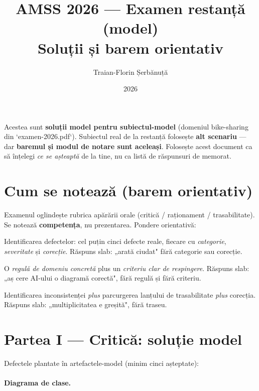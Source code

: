 \documentclass[12pt,a4paper]{article}
\title{AMSS 2026 — Examen restanță (model) \\ \large Soluții și barem orientativ}
\author{Traian-Florin Șerbănuță}
\date{2026}
\begin{document}
\maketitle

\begin{framed}
\noindent Acestea sunt \textbf{soluții model pentru subiectul-model}
(domeniul bike-sharing din `examen-2026.pdf`). Subiectul real de la
restanță folosește \textbf{alt scenariu} — dar \textbf{baremul și modul
de notare sunt aceleași}. Folosește acest document ca să înțelegi
\emph{ce se așteaptă} de la tine, nu ca listă de răspunsuri de memorat.
\end{framed}

\bigskip

\section*{Cum se notează (barem orientativ)}

Examenul oglindește rubrica apărării orale (critică / raționament / trasabilitate). Se notează
\textbf{competența}, nu prezentarea. Pondere orientativă:

\begin{description}[leftmargin=4.5em,style=nextline]
  \item[Partea I — \char`~50\%] Identificarea defectelor: cel puțin
        cinci defecte reale, fiecare cu \emph{categorie}, \emph{severitate}
        și \emph{corecție}. Răspuns slab: „arată ciudat" fără categorie
        sau corecție.
  \item[Partea II — \char`~25\%] O \emph{regulă de domeniu concretă}
        plus un \emph{criteriu clar de respingere}. Răspuns slab: „aș cere
        AI-ului o diagramă corectă", fără regulă și fără criteriu.
  \item[Partea III — \char`~25\%] Identificarea inconsistenței
        \emph{plus} parcurgerea lanțului de trasabilitate \emph{plus}
        corecția. Răspuns slab: „multiplicitatea e greșită", fără traseu.
\end{description}

\section*{Partea I — Critică: soluție model}

Defectele plantate în artefactele-model (minim cinci așteptate):

\paragraph{Diagrama de clase.}
\end{document}
